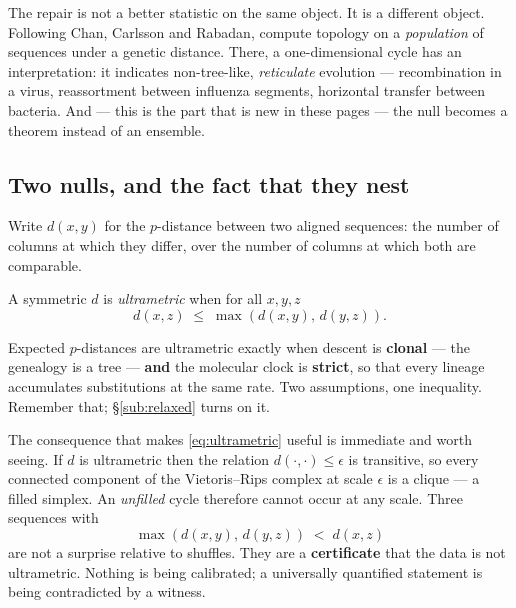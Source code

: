 The repair is not a better statistic on the same object. It is a different
object. Following Chan, Carlsson and Rabadan, compute topology on a
\emph{population} of sequences under a genetic distance. There, a
one-dimensional cycle has an interpretation: it indicates non-tree-like,
\emph{reticulate} evolution --- recombination in a virus, reassortment between
influenza segments, horizontal transfer between bacteria. And --- this is the
part that is new in these pages --- the null becomes a theorem instead of an
ensemble.

\subsection{Two nulls, and the fact that they nest}

Write $d(x,y)$ for the $p$-distance between two aligned sequences: the number of
columns at which they differ, over the number of columns at which both are
comparable.

\begin{definition}[Ultrametric]\label{def:ultrametric}
A symmetric $d$ is \emph{ultrametric} when for all $x,y,z$
\begin{equation}\label{eq:ultrametric}
  d(x,z) \;\le\; \max\!\left(d(x,y),\, d(y,z)\right).
\end{equation}
\end{definition}

\begin{model}\label{mod:clock}
Expected $p$-distances are ultrametric exactly when descent is \textbf{clonal}
--- the genealogy is a tree --- \textbf{and} the molecular clock is
\textbf{strict}, so that every lineage accumulates substitutions at the same
rate. Two assumptions, one inequality. Remember that; \S\ref{sub:relaxed}
turns on it.
\end{model}

The consequence that makes \eqref{eq:ultrametric} useful is immediate and worth
seeing. If $d$ is ultrametric then the relation $d(\cdot,\cdot)\le\epsilon$ is
transitive, so every connected component of the Vietoris--Rips complex at scale
$\epsilon$ is a clique --- a filled simplex. An \emph{unfilled} cycle therefore
cannot occur at any scale. Three sequences with
\begin{equation}\label{eq:certificate}
  \max\!\left(d(x,y),\, d(y,z)\right) \;<\; d(x,z)
\end{equation}
are not a surprise relative to shuffles. They are a \textbf{certificate} that
the data is not ultrametric. Nothing is being calibrated; a universally
quantified statement is being contradicted by a witness.

